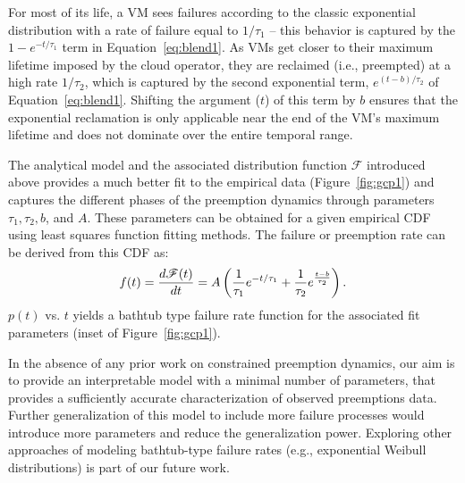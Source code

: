 


For most of its life, a VM sees failures according to the classic exponential distribution with a rate of failure equal to $1/\tau_1$ -- this behavior is captured by the $1-e^{-t/\tau_1}$ term in Equation~\ref{eq:blend1}. 
As VMs get closer to their maximum lifetime imposed by the cloud operator, they are reclaimed (i.e., preempted) at a high rate $1/\tau_2$, which is captured by the second exponential term, $e^{(t-b)/\tau_2}$ of Equation~\ref{eq:blend1}. 
Shifting the argument ($t$) of this term by $b$ ensures that the exponential reclamation is only applicable near the end of the VM's maximum lifetime and does not dominate over the entire temporal range. 

The analytical model and the associated  distribution function $\mathscr{F}$ introduced above provides a much better fit to the empirical data (Figure~\ref{fig:gcp1}) and captures the different phases of the preemption dynamics through parameters $\tau_1, \tau_2, b$, and $A$. These parameters can be obtained for a given empirical CDF using least squares function fitting methods. The failure or preemption rate can be derived from this CDF as:
\begin{equation}
  \label{eq:failrate}
    \vspace*{\eqnspace}
f(t) = \dfrac{d \mathscr{F}(t)} {dt} = A \left(\dfrac{1}{\tau_1}e^{-t/\tau_1} + \dfrac{1}{\tau_2}e^{\frac{t-b}{\tau_2}}\right).
\end{equation}
$p(t)$ vs. $t$ yields a bathtub type failure rate function for the associated fit parameters (inset of Figure~\ref{fig:gcp1}).


In the absence of any prior work on constrained preemption dynamics, our aim is to provide an interpretable model with a minimal number of parameters, that provides a sufficiently accurate characterization of observed preemptions data. 
Further generalization of this model to include more failure processes would introduce more parameters and reduce the generalization power.
Exploring other approaches of modeling bathtub-type failure rates (e.g., exponential Weibull distributions) \cite{mudholkar1993exponentiated,crevecoeur1993model} is part of our future work. 


